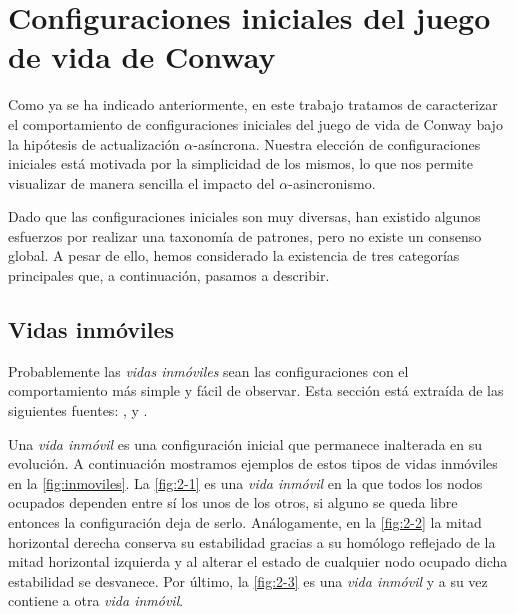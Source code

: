 \documentclass[../proyecto.tex]{memoir}
\begin{document}
\section{Configuraciones iniciales del juego de vida de Conway} \label{zoo}

Como ya se ha indicado anteriormente, en este trabajo tratamos de caracterizar el comportamiento de configuraciones iniciales del juego de vida de Conway bajo la hipótesis de actualización $\alpha$-asíncrona. Nuestra elección de configuraciones iniciales está motivada por la simplicidad de los mismos, lo que nos permite visualizar de manera sencilla el impacto del $\alpha$-asincronismo.

Dado que las configuraciones iniciales son muy diversas, han existido algunos esfuerzos por realizar una taxonomía de patrones, pero no existe un consenso global. A pesar de ello, hemos considerado la existencia de tres categorías principales que, a continuación, pasamos a describir.

\subsection{Vidas inmóviles}
Probablemente las \textit{vidas inmóviles} sean las configuraciones con el comportamiento más simple y fácil de observar. Esta sección está extraída de las siguientes fuentes: \cite{stillLifeProblem},\cite{stillLifeTheory} y \cite{LikeWikiStill}.

Una \textit{vida inmóvil} es una configuración inicial que permanece inalterada en su evolución. A continuación mostramos ejemplos de estos tipos de vidas inmóviles en la \autoref{fig:inmoviles}. La \autoref{fig:2-1} es una \textit{vida inmóvil} en la que todos los nodos ocupados dependen entre sí los unos de los otros, si alguno se queda libre entonces la configuración deja de serlo. Análogamente, en la \autoref{fig:2-2} la mitad horizontal derecha conserva su estabilidad gracias a su homólogo reflejado de la mitad horizontal izquierda y al alterar el estado de cualquier nodo ocupado dicha estabilidad se desvanece. Por último, la \autoref{fig:2-3} es una \textit{vida inmóvil} y a su vez contiene a otra \textit{vida inmóvil}.
\end{document}
